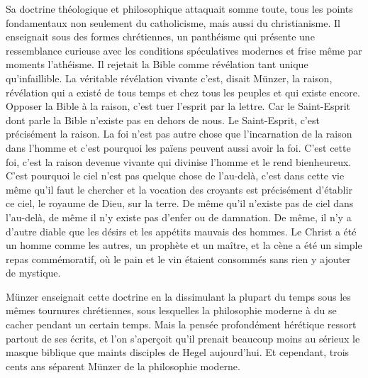 \documentclass[french,twoside]{book} %
\begin{document}
Sa doctrine théologique et philosophique attaquait somme toute, tous les points fondamentaux non seulement du catholicisme, mais aussi du christianisme. Il enseignait sous des formes chrétiennes, un panthéisme qui présente une ressemblance curieuse avec les conditions spéculatives modernes et frise même par moments l’athéisme. Il rejetait la Bible comme révélation tant unique qu’infaillible. La véritable révélation vivante c’est, disait Münzer, la raison, révélation qui a existé de tous temps et chez tous les peuples et qui existe encore. Opposer la Bible à la raison, c’est tuer l’esprit par la lettre. Car le Saint-Esprit dont parle la Bible n’existe pas en dehors de nous. Le Saint-Esprit, c’est précisément la raison. La foi n’est pas autre chose que l’incarnation de la raison dans l’homme et c’est pourquoi les païens peuvent aussi avoir la foi. C’est cette foi, c’est la raison devenue vivante qui divinise l’homme et le rend bienheureux. C’est pourquoi le ciel n’est pas quelque chose de l’au-delà, c’est dans cette vie même qu’il faut le chercher et la vocation des croyants est précisément d’établir ce ciel, le royaume de Dieu, sur la terre. De même qu’il n’existe pas de ciel dans l’au-delà, de même il n’y existe pas d’enfer ou de damnation. De même, il n’y a d’autre diable que les désirs et les appétits mauvais des hommes. Le Christ a été un homme comme les autres, un prophète et un maître, et la cène a été un simple repas commémoratif, où le pain et le vin étaient consommés sans rien y ajouter de mystique.\par
Münzer enseignait cette doctrine en la dissimulant la plupart du temps sous les mêmes tournures chrétiennes, sous lesquelles la philosophie moderne à du se cacher pendant un certain temps. Mais la pensée profondément hérétique ressort partout de ses écrits, et l’on s’aperçoit qu’il prenait beaucoup moins au sérieux le masque biblique que maints disciples de Hegel aujourd’hui. Et cependant, trois cents ans séparent Münzer de la philosophie moderne.\par
\end{document}
